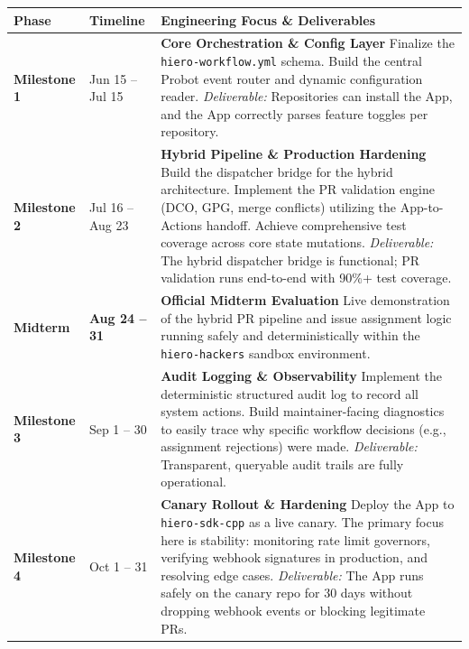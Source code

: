 \documentclass[11pt]{article}
\begin{document}
\vspace{10pt}
\begin{table}[H]
\centering
\renewcommand{\arraystretch}{1.4}
\begin{tabularx}{\textwidth}{@{} >{\bfseries}l l X @{}}
\toprule
Phase & \textbf{Timeline} & \textbf{Engineering Focus \& Deliverables} \\
\midrule
Milestone 1 & Jun 15 -- Jul 15 &
\textbf{Core Orchestration \& Config Layer} \newline
Finalize the \texttt{hiero-workflow.yml} schema. Build the central Probot event router and dynamic configuration reader. \newline \textit{Deliverable:} Repositories can install the App, and the App correctly parses feature toggles per repository. \\

Milestone 2 & Jul 16 -- Aug 23 &
\textbf{Hybrid Pipeline \& Production Hardening} \newline
Build the dispatcher bridge for the hybrid architecture. Implement the PR validation engine (DCO, GPG, merge conflicts) utilizing the App-to-Actions handoff. Achieve comprehensive test coverage across core state mutations. \newline \textit{Deliverable:} The hybrid dispatcher bridge is functional; PR validation runs end-to-end with 90\%+ test coverage. \\

\rowcolor{gray!10}
Midterm & \textbf{Aug 24 -- 31} &
\textbf{Official Midterm Evaluation} \newline
Live demonstration of the hybrid PR pipeline and issue assignment logic running safely and deterministically within the \texttt{hiero-hackers} sandbox environment. \\
Milestone 3 & Sep 1 -- 30 &
\textbf{Audit Logging \& Observability} \newline
Implement the deterministic structured audit log to record all system actions. Build maintainer-facing diagnostics to easily trace why specific workflow decisions (e.g., assignment rejections) were made. \newline \textit{Deliverable:} Transparent, queryable audit trails are fully operational. \\

Milestone 4 & Oct 1 -- 31 &
\textbf{Canary Rollout \& Hardening} \newline
Deploy the App to \texttt{hiero-sdk-cpp} as a live canary. The primary focus here is stability: monitoring rate limit governors, verifying webhook signatures in production, and resolving edge cases. \newline \textit{Deliverable:} The App runs safely on the canary repo for 30 days without dropping webhook events or blocking legitimate PRs. \\


\end{tabularx}
\end{table}
\end{document}
